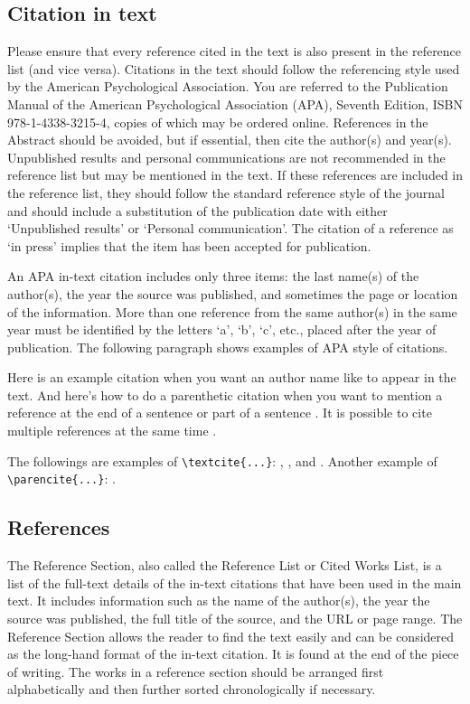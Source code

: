 \documentclass[12pt,a4paper]{article}
\begin{document}
\subsection{Citation in text}
Please ensure that every reference cited in the text is also present in the reference list (and vice versa). Citations in the text should follow the referencing style used by the American Psychological Association. You are referred to the Publication Manual of the American Psychological Association (APA), Seventh Edition, ISBN 978-1-4338-3215-4, copies of which may be ordered online. References in the Abstract should be avoided, but if essential, then cite the author(s) and year(s). Unpublished results and personal communications are not recommended in the reference list but may be mentioned in the text. If these references are included in the reference list, they should follow the standard reference style of the journal and should include a substitution of the publication date with either ‘Unpublished results’ or ‘Personal communication’. The citation of a reference as ‘in press’ implies that the item has been accepted for publication. 

An APA in-text citation includes only three items: the last name(s) of the author(s), the year the source was published, and sometimes the page or location of the information. More than one reference from the same author(s) in the same year must be identified by the letters ‘a’, ‘b’, ‘c’, etc., placed after the year of publication. The following paragraph shows examples of APA style of citations.

Here is an example citation when you want an author name like \textcite{collins2011a} to appear in the text. And here's how to do a parenthetic citation when you want to mention a reference at the end of a sentence or part of a sentence \parencite{collins2013}. It is possible to cite multiple references at the same time \parencite{collins2011b,collins2016,lunn2007a,lunn2007b,ross2006,shannon1948}.

The followings are examples of \verb+\textcite{...}+: \textcite{rahman2019centroidb}, \textcite{krizhevsky2012imagenet, horvath2018dna}, and \textcite{lecun2015deep, zhang2018fine, ravi2016deep}. Another example of \verb+\parencite{...}+: \parencite{bahdanau2014neural,imboden2018cardiorespiratory,motiian2017unified,murphy2012machine,ji20123d}.

\subsection{References}
The Reference Section, also called the Reference List or Cited Works List, is a list of the full-text details of the in-text citations that have been used in the main text. It includes information such as the name of the author(s), the year the source was published, the full title of the source, and the URL or page range. The Reference Section allows the reader to find the text easily and can be considered as the long-hand format of the in-text citation. It is found at the end of the piece of writing. The works in a reference section should be arranged first alphabetically and then further sorted chronologically if necessary.
\end{document}
